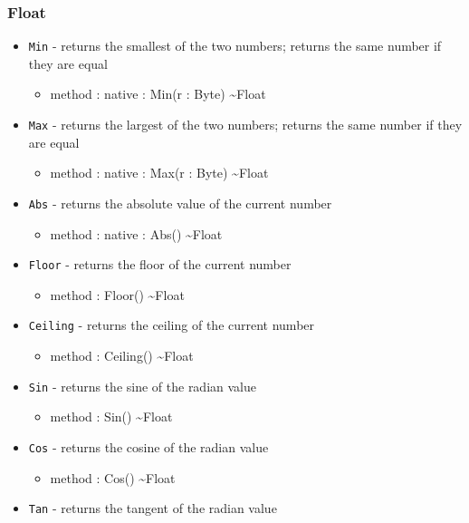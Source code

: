 \documentclass[12pt]{article}
\begin{document}
\subsubsection{Float}
\begin{itemize}
\item \texttt{Min} - returns the smallest of the two numbers; returns
  the same number if they are equal
  \begin{itemize}
  \item method : native : Min(r : Byte) \textasciitilde Float
  \end{itemize}
\item \texttt{Max} - returns the largest of the two numbers; returns
  the same number if they are equal
  \begin{itemize}
  \item method : native : Max(r : Byte) \textasciitilde Float
  \end{itemize}
\item \texttt{Abs} - returns the absolute value of the current number
  \begin{itemize}
  \item method : native : Abs() \textasciitilde Float
  \end{itemize}
\item \texttt{Floor} - returns the floor of the current number
  \begin{itemize}
  \item method : Floor() \textasciitilde Float
  \end{itemize}
\item \texttt{Ceiling} - returns the ceiling of the current number
  \begin{itemize}
  \item method : Ceiling() \textasciitilde Float
  \end{itemize}
\item \texttt{Sin} - returns the sine of the radian value
  \begin{itemize}
  \item method : Sin() \textasciitilde Float
  \end{itemize}
\item \texttt{Cos} - returns the cosine of the radian value
  \begin{itemize}
  \item method : Cos() \textasciitilde Float
  \end{itemize}
\item \texttt{Tan} - returns the tangent of the radian value
  \begin{itemize}

\end{itemize}
\end{itemize}
\end{document}
